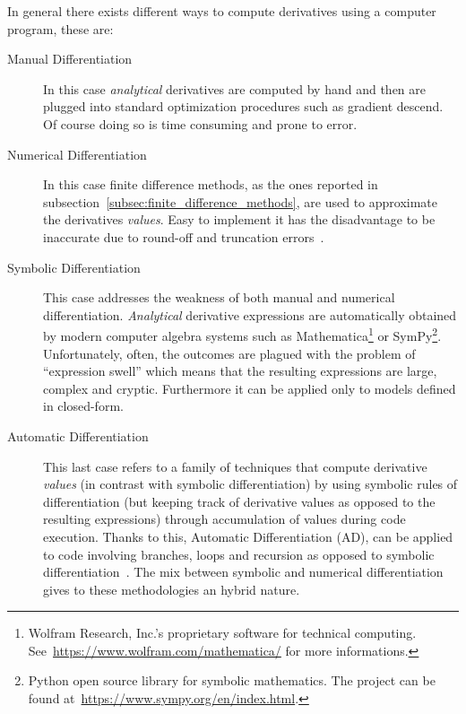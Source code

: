 In general there exists different ways to compute derivatives using a computer program, these are:
\begin{description}
	\item[Manual Differentiation] In this case \emph{analytical} derivatives are computed by hand and then are plugged into standard optimization procedures such as gradient descend. Of course doing so is time consuming and prone to error.
	
	\item[Numerical Differentiation] In this case finite difference methods, as the ones reported in subsection~\ref{subsec:finite_difference_methods}, are used to approximate the derivatives \emph{values}. Easy to implement it has the disadvantage to be inaccurate due to round-off and truncation errors~\cite{LeVeque:FD_book}.

	\item[Symbolic Differentiation] This case addresses the weakness of both manual and numerical differentiation. \emph{Analytical} derivative expressions are automatically obtained by modern computer algebra systems such as Mathematica\footnote{Wolfram Research, Inc.'s proprietary software for technical computing. See~\url{https://www.wolfram.com/mathematica/} for more informations.} or SymPy\footnote{Python open source library for symbolic mathematics. The project can be found at~\url{https://www.sympy.org/en/index.html}.}. Unfortunately, often, the outcomes are plagued with the problem of ``expression swell'' which means that the resulting expressions are large, complex and cryptic. Furthermore it can be applied only to models defined in closed-form.
	
	\item[Automatic Differentiation] This last case refers to a family of techniques that compute derivative \emph{values} (in contrast with symbolic differentiation) by using symbolic rules of differentiation (but keeping track of derivative values as opposed to the resulting expressions) through accumulation of values during code execution. Thanks to this, Automatic Differentiation (AD), can be applied to code involving branches, loops and recursion as opposed to symbolic differentiation~\cite{Baydin:AD_survey}. The mix between symbolic and numerical differentiation gives to these methodologies an hybrid nature.
\end{description}

